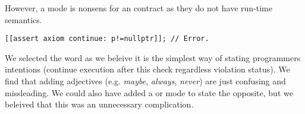 However, a mode is nonsens for an  contract as they do not have
run-time semantics.

\begin{lstlisting}
[[assert axiom continue: p!=nullptr]]; // Error.
\end{lstlisting}

We selected the word  as we beleive it is the simplest way of
stating programmers intentions (continue execution after this check regardless
violation status). We find that adding adjectives (e.g. \emph{maybe}, \emph{always},
\emph{never}) are just confusing and missleading. We could also have added
a  or  mode to state the opposite, but we beleived
that this was an unnecessary complication.
